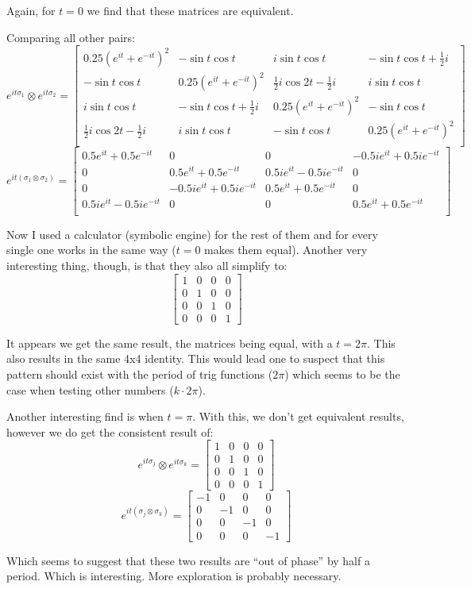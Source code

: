 \documentclass{article}
\begin{document}
Again, for $t=0$ we find that these matrices are equivalent. 

Comparing all other pairs: 
\[ e^{it\sigma_1} \otimes e^{it\sigma_2} = \left[
    \begin{array}{cccc}
    0.25(e^{it} + e^{-it})^2 & -\sin{t}\cos{t} & i\sin{t}\cos{t} & -\sin{t}\cos{t} + \frac{1}{2}i \\
    -\sin{t}\cos{t} & 0.25(e^{it} + e^{-it})^2 & \frac{1}{2}i\cos{2t} - \frac{1}{2}i & i\sin{t}\cos{t} \\
    i\sin{t}\cos{t} & -\sin{t}\cos{t} + \frac{1}{2}i & 0.25(e^{it} + e^{-it})^2 & -\sin{t}\cos{t} \\
    \frac{1}{2}i\cos{2t} - \frac{1}{2}i & i\sin{t}\cos{t} & -\sin{t}\cos{t} & 0.25(e^{it} + e^{-it})^2 \\
    \end{array}
    \right] \]
\[ e^{it(\sigma_1 \otimes \sigma_2)} = \left[
    \begin{array}{cccc}
    0.5e^{it} + 0.5e^{-it} & 0 & 0 & -0.5ie^{it} + 0.5ie^{-it} \\
    0 & 0.5e^{it} + 0.5e^{-it} & 0.5ie^{it} - 0.5ie^{-it} & 0 \\
    0 & -0.5ie^{it} + 0.5ie^{-it} & 0.5e^{it} + 0.5e^{-it} & 0 \\
    0.5ie^{it} - 0.5ie^{-it} & 0 & 0 & 0.5e^{it} + 0.5e^{-it} \\
    \end{array}
    \right] \]

Now I used a calculator (symbolic engine) for the rest of them and for every single one works in the same way ($t=0$ makes them equal). Another very interesting thing, though, is that they also all simplify to: 
\[ \begin{bmatrix}
    1 & 0 & 0 & 0 \\ 
    0 & 1 & 0 & 0 \\ 
    0 & 0 & 1 & 0 \\
    0 & 0 & 0 & 1
\end{bmatrix} \] 

It appears we get the same result, the matrices being equal, with a $t = 2\pi$. This also results in the same 4x4 identity. This would lead one to suspect that this pattern should exist with the period of trig functions ($2\pi$) which seems to be the case when testing other numbers ($k\cdot 2\pi$). 

Another interesting find is when $t = \pi$. With this, we don't get equivalent results, however we do get the consistent result of: 
\[ e^{it\sigma_j} \otimes e^{it\sigma_k} = \begin{bmatrix}
    1 & 0 & 0 & 0 \\
    0 & 1 & 0 & 0 \\
    0 & 0 & 1 & 0 \\
    0 & 0 & 0 & 1
\end{bmatrix} \]
\[ e^{it(\sigma_j \otimes \sigma_k)} = \begin{bmatrix}
    -1 & 0 & 0 & 0 \\ 
    0 & -1 & 0 & 0 \\
    0 & 0 & -1 & 0 \\ 
    0 & 0 & 0 & -1
\end{bmatrix} \]

Which seems to suggest that these two results are ``out of phase'' by half a period. Which is interesting. More exploration is probably necessary. 
\end{document}
